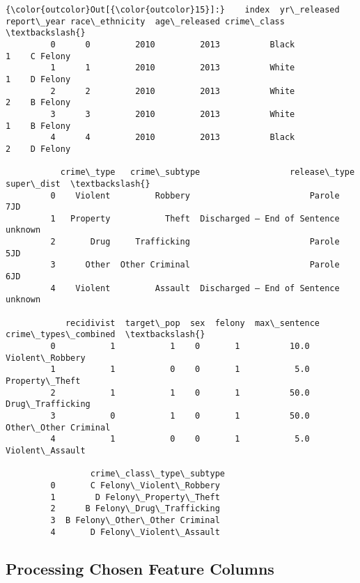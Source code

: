 \documentclass[11pt]{article}
\begin{document}
\begin{Verbatim}[commandchars=\\\{\}]
{\color{outcolor}Out[{\color{outcolor}15}]:}    index  yr\_released  report\_year race\_ethnicity  age\_released crime\_class  \textbackslash{}
         0      0         2010         2013          Black             1    C Felony   
         1      1         2010         2013          White             1    D Felony   
         2      2         2010         2013          White             2    B Felony   
         3      3         2010         2013          White             1    B Felony   
         4      4         2010         2013          Black             2    D Felony   
         
           crime\_type   crime\_subtype                  release\_type super\_dist  \textbackslash{}
         0    Violent         Robbery                        Parole        7JD   
         1   Property           Theft  Discharged – End of Sentence    unknown   
         2       Drug     Trafficking                        Parole        5JD   
         3      Other  Other Criminal                        Parole        6JD   
         4    Violent         Assault  Discharged – End of Sentence    unknown   
         
            recidivist  target\_pop  sex  felony  max\_sentence  crime\_types\_combined  \textbackslash{}
         0           1           1    0       1          10.0       Violent\_Robbery   
         1           1           0    0       1           5.0        Property\_Theft   
         2           1           1    0       1          50.0      Drug\_Trafficking   
         3           0           1    0       1          50.0  Other\_Other Criminal   
         4           1           0    0       1           5.0       Violent\_Assault   
         
                 crime\_class\_type\_subtype  
         0       C Felony\_Violent\_Robbery  
         1        D Felony\_Property\_Theft  
         2      B Felony\_Drug\_Trafficking  
         3  B Felony\_Other\_Other Criminal  
         4       D Felony\_Violent\_Assault  
\end{Verbatim}
            
    \hypertarget{processing-chosen-feature-columns}{%
\subsection{Processing Chosen Feature
Columns}\label{processing-chosen-feature-columns}}
\end{document}
